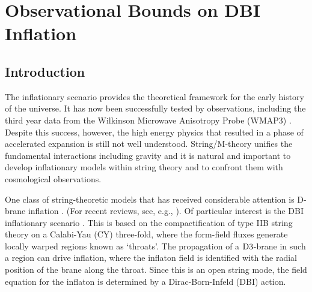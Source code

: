 \renewcommand{\CVSrevision}{\version$Id: dbi.tex,v 1.5 2009/07/14 17:19:12 ith Exp $}
% 

\chapter{Observational Bounds on DBI Inflation}
\label{ch:dbi}
% 
% 
% 
\section{Introduction}
% 
\label{sec:intro}

The inflationary scenario provides the 
theoretical framework for the early history 
of the universe. It has now been successfully tested by observations, 
including the third year data from the Wilkinson Microwave Anisotropy 
Probe (WMAP3) \cite{spergel}. Despite this success, however, the high energy 
physics that resulted in a phase of accelerated expansion is still 
not well understood. String/M-theory unifies the fundamental interactions 
including gravity and it is natural and important to 
develop inflationary models within string theory and to confront them with 
cosmological observations. 
 
One class of string-theoretic models that has received 
considerable attention is D-brane inflation
\cite{brane1,brane2,brane3,brane4,brane5,brane6,brane7,brane8,brane9,brane10,brane11,brane12,brane13,brane14,brane15,brane16,brane17,Brodie:2003qv,Vikman:2006hk,Mukhanov:2005bu,Kallosh:2007wm,brane18,brane19,brane20,brane21}. 
(For recent reviews, see, e.g., \cite{tyereview,cline}). 
Of particular interest 
is the DBI inflationary scenario \cite{brane6,brane11}. 
This is based on the compactification of type IIB string theory on a 
Calabi-Yau (CY) three-fold, where the form-field fluxes generate locally
warped regions known as `throats'.  The propagation of a 
${\rm D3}$-brane in such a region can drive inflation, where the inflaton 
field is identified with the radial position of the brane 
along the throat. Since this is an open string mode, the field 
equation for the inflaton is determined by a Dirac-Born-Infeld (DBI) action. 

